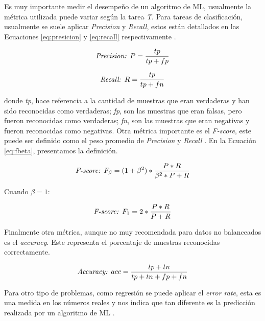 Es muy importante medir el desempeño de un algoritmo de ML, usualmente la métrica utilizada puede variar según la tarea \textit{T}. Para tareas de clasificación, usualmente se suele aplicar \textit{Precision} y \textit{Recall}, estos están detallados en las Ecuaciones \ref{eq:presicion} y \ref{eq:recall} respectivamente \citep{dalianis2018evaluation}.


\begin{equation} \label{eq:presicion}
	\mbox{\textit{Precision: }} P = \frac{tp}{tp + fp}
\end{equation}

\begin{equation} \label{eq:recall}
	\mbox{\textit{Recall: }} R = \frac{tp}{tp + fn}
\end{equation}

donde \textit{tp}, hace referencia a la cantidad de muestras que eran verdaderas y han sido reconocidas como verdaderas; \textit{fp}, son las muestras que eran falsas, pero fueron reconocidas como verdaderas; \textit{fn}, son las muestras que eran negativas y fueron reconocidas como negativas. Otra métrica importante es el \textit{F-score}, este puede ser definido como el peso promedio de \textit{Precision} y \textit{Recall}  \citep{dalianis2018evaluation}. En la Ecuación \ref{eq:fbeta}, presentamos la definición.


 
\begin{equation} \label{eq:fbeta}
	\mbox{\textit{F-score: }} F_\beta = (1 + \beta^2) * \frac{P*R}{\beta^2*P + R}
\end{equation}

Cuando $\beta = 1$:
 
\begin{equation} \label{eq:f1}
	\mbox{\textit{F-score: }} F_1 = 2 * \frac{P*R}{P + R}
\end{equation}

Finalmente otra métrica, aunque no muy recomendada para datos no balanceados es el \textit{accuracy}. Este representa el porcentaje de muestras reconocidas correctamente.

\begin{equation} \label{eq:f1}
	\mbox{\textit{Accuracy: }} acc = \frac{tp + tn}{ tp +tn +fp +fn}
\end{equation}


Para otro tipo de problemas, como regresión se puede aplicar el \textit{error rate}, esta es una medida en los números reales y nos indica que tan diferente es la predicción realizada por un algoritmo de ML \citep{Goodfellow2016}.


